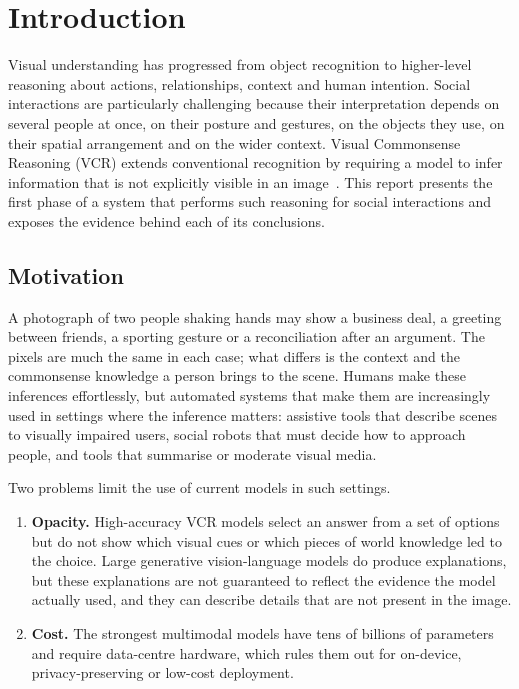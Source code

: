 \documentclass[12pt,a4paper,oneside]{report}
\begin{document}
\cleardoublepage
{}

\chapter{Introduction}
\label{ch:intro}

Visual understanding has progressed from object recognition to higher-level
reasoning about actions, relationships, context and human intention. Social
interactions are particularly challenging because their interpretation depends
on several people at once, on their posture and gestures, on the objects they
use, on their spatial arrangement and on the wider context. Visual Commonsense
Reasoning (VCR) extends conventional recognition by requiring a model to infer
information that is not explicitly visible in an image~\cite{zellers2019vcr}.
This report presents the first phase of a system that performs such reasoning
for social interactions and exposes the evidence behind each of its
conclusions.

\section{Motivation}

A photograph of two people shaking hands may show a business deal, a greeting
between friends, a sporting gesture or a reconciliation after an argument. The
pixels are much the same in each case; what differs is the context and the
commonsense knowledge a person brings to the scene. Humans make these
inferences effortlessly, but automated systems that make them are increasingly
used in settings where the inference matters: assistive tools that describe
scenes to visually impaired users, social robots that must decide how to
approach people, and tools that summarise or moderate visual media.

Two problems limit the use of current models in such settings.

\begin{enumerate}[leftmargin=*]
\item \textbf{Opacity.} High-accuracy VCR models select an answer from a set of
  options but do not show which visual cues or which pieces of world knowledge
  led to the choice. Large generative vision-language models do produce
  explanations, but these explanations are not guaranteed to reflect the
  evidence the model actually used, and they can describe details that are not
  present in the image.
\item \textbf{Cost.} The strongest multimodal models have tens of billions of
  parameters and require data-centre hardware, which rules them out for
  on-device, privacy-preserving or low-cost deployment.
\end{enumerate}
\end{document}
